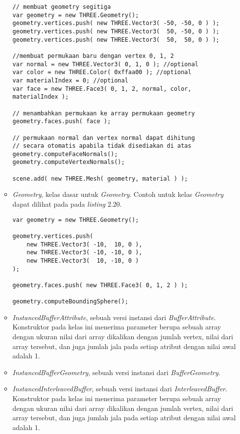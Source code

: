 \begin{itemize}
\begin{itemize}
\begin{lstlisting}[caption={Contoh penggunaan {\it Face3} pada suatu {\it Geometry}.},captionpos=b]
// membuat geometry segitiga
var geometry = new THREE.Geometry();
geometry.vertices.push( new THREE.Vector3( -50, -50, 0 ) );
geometry.vertices.push( new THREE.Vector3(  50, -50, 0 ) );
geometry.vertices.push( new THREE.Vector3(  50,  50, 0 ) );

//membuat permukaan baru dengan vertex 0, 1, 2
var normal = new THREE.Vector3( 0, 1, 0 ); //optional
var color = new THREE.Color( 0xffaa00 ); //optional
var materialIndex = 0; //optional
var face = new THREE.Face3( 0, 1, 2, normal, color, materialIndex );

// menambahkan permukaan ke array permukaan geometry
geometry.faces.push( face );

// permukaan normal dan vertex normal dapat dihitung
// secara otomatis apabila tidak disediakan di atas
geometry.computeFaceNormals();
geometry.computeVertexNormals();

scene.add( new THREE.Mesh( geometry, material ) );
\end{lstlisting}

	\item{\it Geometry}, kelas dasar untuk {\it Geometry}. Contoh untuk kelas {\it Geometry} dapat dilihat pada pada {\it listing} 2.20.
\begin{lstlisting}[caption={Contoh instansiasi kelas {\it Geometry}.},captionpos=b]
var geometry = new THREE.Geometry();

geometry.vertices.push(
	new THREE.Vector3( -10,  10, 0 ),
	new THREE.Vector3( -10, -10, 0 ),
	new THREE.Vector3(  10, -10, 0 )
);

geometry.faces.push( new THREE.Face3( 0, 1, 2 ) );

geometry.computeBoundingSphere();
\end{lstlisting}

	\item{\it InstancedBufferAttribute}, sebuah versi instansi dari {\it BufferAttribute}. Konstruktor pada kelas ini menerima parameter berupa sebuah array dengan ukuran nilai dari array dikalikan dengan jumlah vertex, nilai dari array tersebut, dan juga jumlah jala pada setiap atribut dengan nilai awal adalah 1.
	
	\item{\it InstancedBufferGeometry}, sebuah versi instansi dari {\it BufferGeometry}.
	
	\item{\it InstancedInterleavedBuffer}, sebuah versi instansi dari {\it InterleavedBuffer}. Konstruktor pada kelas ini menerima parameter berupa sebuah array dengan ukuran nilai dari array dikalikan dengan jumlah vertex, nilai dari array tersebut, dan juga jumlah jala pada setiap atribut dengan nilai awal adalah 1.
	

\end{itemize}
\end{itemize}
